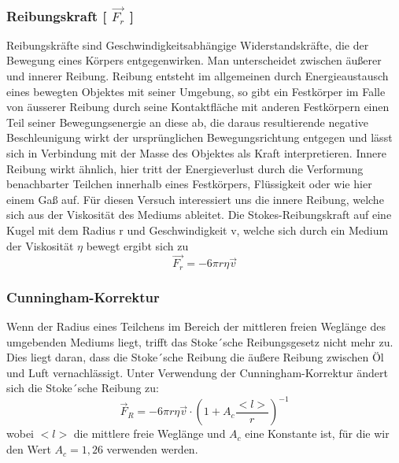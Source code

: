 \documentclass{scrartcl}
\begin{document}
			\subsubsection{Reibungskraft [ $\vec{F_r}$ ]}
			Reibungskräfte sind Geschwindigkeitsabhängige Widerstandskräfte, die der Bewegung eines Körpers entgegenwirken.
			Man unterscheidet zwischen äußerer und innerer Reibung.
			Reibung entsteht im allgemeinen durch Energieaustausch eines bewegten Objektes mit seiner Umgebung,
			so gibt ein Festkörper im Falle von äusserer Reibung durch seine Kontaktfläche mit anderen Festkörpern
			einen Teil seiner Bewegungsenergie an diese ab, die daraus resultierende negative Beschleunigung wirkt
			der ursprünglichen Bewegungsrichtung entgegen und lässt sich in Verbindung mit der Masse des Objektes als
			Kraft interpretieren. Innere Reibung wirkt ähnlich, hier tritt der Energieverlust durch die Verformung
			benachbarter Teilchen innerhalb eines Festkörpers, Flüssigkeit oder wie hier einem Gaß auf.
			Für diesen Versuch interessiert uns die innere Reibung, welche sich aus der Viskosität des Mediums ableitet.
			Die Stokes-Reibungskraft auf eine Kugel mit dem Radius r und Geschwindigkeit v, welche sich durch ein Medium der Viskosität $\eta$ bewegt ergibt sich zu
			\begin{equation}
				\vec{F_r} = -6 \pi r \eta \vec{v}
			\end{equation}
		\subsubsection{Cunningham-Korrektur}
			Wenn der Radius eines Teilchens im Bereich der mittleren freien Weglänge des umgebenden Mediums liegt, trifft das Stoke´sche Reibungsgesetz nicht mehr zu.
			Dies liegt daran, dass die Stoke´sche Reibung die äußere Reibung zwischen Öl und Luft vernachlässigt.
			Unter Verwendung der Cunningham-Korrektur ändert sich die Stoke´sche Reibung zu:
			\begin{equation}
				\vec{F}_R = -6 \pi r \eta \vec{v} \cdot (1 + A_c \frac{<l>}{r})^{-1}
			\end{equation}
			wobei $<l>$ die mittlere freie Weglänge und $A_c$ eine Konstante ist, für die wir den Wert $A_c = 1,26$ verwenden werden.
\end{document}

